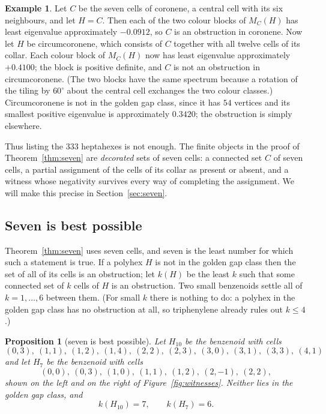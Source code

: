 \documentclass[11pt]{article}
\newtheorem{proposition}[theorem]{Proposition}
\theoremstyle{definition}
\newtheorem{example}[theorem]{Example}
\begin{document}
\begin{example}\label{ex:coronene}
Let $C$ be the seven cells of coronene, a central cell with its six
neighbours, and let $H=C$.  Then each of the two colour blocks of $M_C(H)$
has least eigenvalue approximately
$-0.0912$, so $C$ is an obstruction in coronene.  Now let $H$ be
circumcoronene, which consists of $C$ together with all twelve cells of its
collar.  Each colour block of $M_C(H)$ now has least eigenvalue approximately
$+0.4100$; the block is positive definite, and $C$ is not an obstruction in
circumcoronene.  (The two blocks have the same spectrum because a rotation of
the tiling by $60^\circ$ about the central cell exchanges the two colour
classes.)  Circumcoronene is not in the golden gap class, since it has
$54$ vertices and its smallest positive eigenvalue is approximately $0.3420$;
the obstruction is simply elsewhere.
\end{example}

Thus listing the $333$ heptahexes is not enough.  The finite objects in the proof
of Theorem~\ref{thm:seven} are \textsl{decorated} sets of seven cells: a
connected set $C$ of seven cells, a partial assignment of the cells of its
collar as present or absent, and a witness whose negativity survives every
way of completing the assignment.  We will make this precise in
Section~\ref{sec:seven}.

\subsection{Seven is best possible}\label{sec:optimality}

Theorem~\ref{thm:seven} uses seven cells, and seven is the least number for
which such a statement is true.  If a polyhex $H$ is not in the golden gap
class then the set of all of its cells is an obstruction; let $k(H)$ be the
least $k$ such that some connected set of $k$ cells of $H$ is an
obstruction.  Two small benzenoids settle all of $k=1,\ldots,6$ between
them.  (For small $k$ there is nothing to do: a polyhex in the golden gap
class has no obstruction at all, so triphenylene already rules out $k\le4$.)

\begin{proposition}[seven is best possible]\label{prop:nosix}
Let $H_{10}$ be the benzenoid with cells
\[
 (0,3),\ (1,1),\ (1,2),\ (1,4),\ (2,2),\ (2,3),\ (3,0),\ (3,1),\ (3,3),\ (4,1)
\]
and let $H_{7}$ be the benzenoid with cells
\[
 (0,0),\ (0,3),\ (1,0),\ (1,1),\ (1,2),\ (2,-1),\ (2,2) ,
\]
shown on the left and on the right of Figure~\ref{fig:witnesses}.  Neither
lies in the golden gap class, and
\[
 k(H_{10})=7,\qquad k(H_{7})=6 .
\]
\end{proposition}
\end{document}
